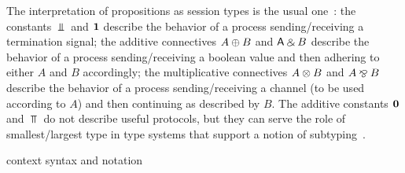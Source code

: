 The interpretation of propositions as session types is the usual
one~\cite{Wadler14}: the constants $\Bot$ and $\mathbf{1}$ describe the behavior of a
process sending/receiving a termination signal; the additive connectives $A
\mathbin\oplus B$ and $\mathsf{A} \mathbin\binampersand B$ describe the behavior of a process sending/receiving a
boolean value and then adhering to either $A$ and $B$ accordingly; the
multiplicative connectives $A \mathbin\otimes B$ and $A \mathbin\bindnasrepma B$ describe the behavior of a
process sending/receiving a channel (to be used according to $A$) and then
continuing as described by $B$. The additive constants $\mathbf{0}$ and $\Top$ do not
describe useful protocols, but they can serve the role of smallest/largest type
in type systems that support a notion of subtyping~\citep{HornePadovani24}.

context syntax and notation

